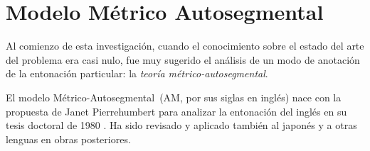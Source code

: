 \section{Modelo M\'etrico Autosegmental} \label{autosegmental}
Al comienzo de esta investigaci\'on, cuando el conocimiento sobre el estado del arte del problema era casi nulo, fue muy sugerido el an\'alisis de un modo de anotaci\'on de la entonaci\'on particular: la \emph{teoría métrico-autosegmental}.


El modelo Métrico-Autosegmental~(AM, por sus siglas en ingl\'es) nace con la propuesta de Janet Pierrehumbert para analizar la entonaci\'on del ingl\'es en su tesis doctoral de 1980 \cite{pierrehumbert1980phonology}. Ha sido revisado  y aplicado también al japonés \cite{beckman1986intonational} y a otras lenguas en obras posteriores. 


